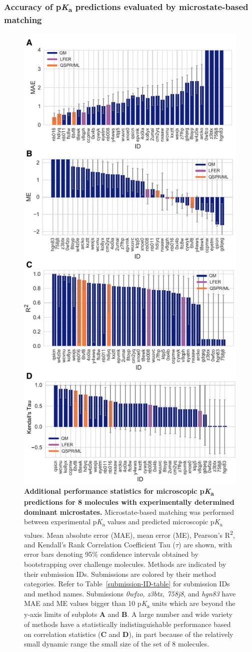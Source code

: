\documentclass[9pt,lineno,final]{elife}
\newcommand{\pKa}{p\textit{K}\textsubscript{a}}
\begin{document}
\subsubsection{Accuracy of \pKa{} predictions evaluated by microstate-based matching}

\begin{figure}
\centering
\includegraphics[width=0.5\linewidth]{figures/typeI_statistics.pdf}
\caption{{\bf Additional performance statistics for microscopic \pKa{} predictions for 8 molecules with experimentally determined dominant microstates.} 
Microstate-based matching was performed between experimental \pKa{} values and predicted microscopic \pKa{}~ values. 
Mean absolute error (MAE), mean error (ME), Pearson’s R\textsuperscript{2}, and Kendall’s Rank Correlation Coefficient Tau ($\tau$) are shown, with error bars denoting 95\% confidence intervals obtained by bootstrapping over challenge molecules. 
Methods are indicated by their submission IDs. 
Submissions are colored by their method categories. 
Refer to Table~\ref{submission-ID-table} for submission IDs and method names. Submissions \textit{0wfzo, z3btx, 758j8}, and \textit{hgn83} have MAE and ME values bigger than 10 \pKa{} units which are beyond the y-axis limits of subplots {\bf A} and {\bf B}. 
A large number and wide variety of methods have a statistically indistinguishable performance based on correlation statistics ({\bf C} and {\bf D}), in part because of the relatively small dynamic range the small size of the set of 8 molecules.
}
\label{fig:typeI-statistics}
\end{figure}
\end{document}
